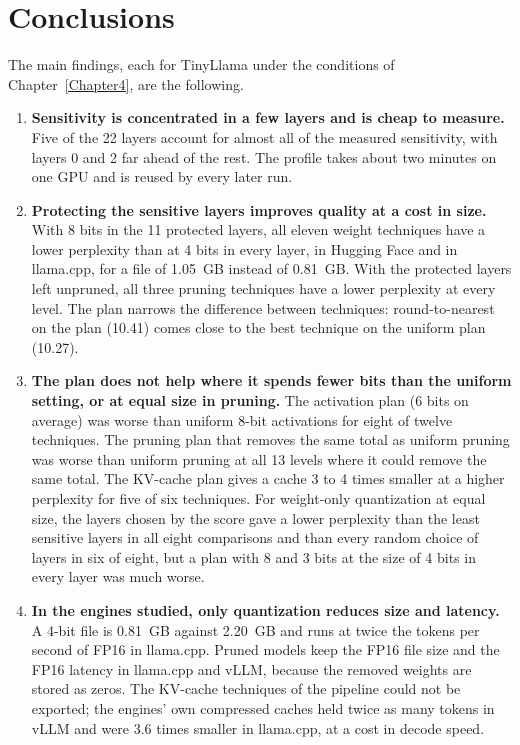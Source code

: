 \documentclass[
11pt, %
english, %
singlespacing, %
headsepline, %
]{MastersDoctoralThesis} %
\begin{document}
\section{Conclusions}
\label{sec:ch6-conclusions}

The main findings, each for TinyLlama under the conditions of Chapter~\ref{Chapter4}, are the following.

\begin{enumerate}
  \item \textbf{Sensitivity is concentrated in a few layers and is cheap to measure.} Five of the 22 layers account for almost all of the measured sensitivity, with layers 0 and 2 far ahead of the rest. The profile takes about two minutes on one GPU and is reused by every later run.
  \item \textbf{Protecting the sensitive layers improves quality at a cost in size.} With 8 bits in the 11 protected layers, all eleven weight techniques have a lower perplexity than at 4 bits in every layer, in Hugging Face and in llama.cpp, for a file of 1.05~GB instead of 0.81~GB. With the protected layers left unpruned, all three pruning techniques have a lower perplexity at every level. The plan narrows the difference between techniques: round-to-nearest on the plan (10.41) comes close to the best technique on the uniform plan (10.27).
  \item \textbf{The plan does not help where it spends fewer bits than the uniform setting, or at equal size in pruning.} The activation plan (6 bits on average) was worse than uniform 8-bit activations for eight of twelve techniques. The pruning plan that removes the same total as uniform pruning was worse than uniform pruning at all 13 levels where it could remove the same total. The KV-cache plan gives a cache 3 to 4 times smaller at a higher perplexity for five of six techniques. For weight-only quantization at equal size, the layers chosen by the score gave a lower perplexity than the least sensitive layers in all eight comparisons and than every random choice of layers in six of eight, but a plan with 8 and 3 bits at the size of 4 bits in every layer was much worse.
  \item \textbf{In the engines studied, only quantization reduces size and latency.} A 4-bit file is 0.81~GB against 2.20~GB and runs at twice the tokens per second of FP16 in llama.cpp. Pruned models keep the FP16 file size and the FP16 latency in llama.cpp and vLLM, because the removed weights are stored as zeros. The KV-cache techniques of the pipeline could not be exported; the engines' own compressed caches held twice as many tokens in vLLM and were 3.6 times smaller in llama.cpp, at a cost in decode speed.

\end{enumerate}
\end{document}
